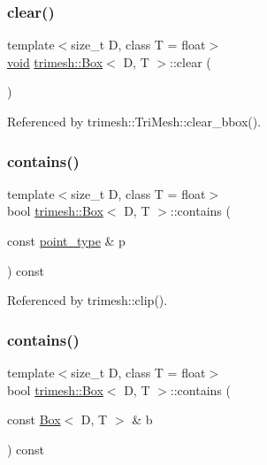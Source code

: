 \subsubsection{\texorpdfstring{clear()}{clear()}}
{\footnotesize\ttfamily template$<$size\+\_\+t D, class T = float$>$ \\
\hyperlink{namespacetrimesh_a784ddfd979e1c579bda795a8edfc3f43}{void} \hyperlink{classtrimesh_1_1Box}{trimesh\+::\+Box}$<$ D, T $>$\+::clear (\begin{DoxyParamCaption}{ }\end{DoxyParamCaption})\hspace{0.3cm}{\ttfamily [inline]}}



Referenced by trimesh\+::\+Tri\+Mesh\+::clear\+\_\+bbox().

\mbox{\label{classtrimesh_1_1Box_abed49b215db7d2affea33694a82327d4}} 
\subsubsection{\texorpdfstring{contains()}{contains()}\hspace{0.1cm}{\footnotesize\ttfamily [1/2]}}
{\footnotesize\ttfamily template$<$size\+\_\+t D, class T = float$>$ \\
bool \hyperlink{classtrimesh_1_1Box}{trimesh\+::\+Box}$<$ D, T $>$\+::contains (\begin{DoxyParamCaption}\item[{const \hyperlink{classtrimesh_1_1Box_a208c806781f96a7001491a275dfa7655}{point\+\_\+type} \&}]{p }\end{DoxyParamCaption}) const\hspace{0.3cm}{\ttfamily [inline]}}



Referenced by trimesh\+::clip().

\mbox{\label{classtrimesh_1_1Box_a8846c5b376e879c540e65e128e372cf2}} 
\subsubsection{\texorpdfstring{contains()}{contains()}\hspace{0.1cm}{\footnotesize\ttfamily [2/2]}}
{\footnotesize\ttfamily template$<$size\+\_\+t D, class T = float$>$ \\
bool \hyperlink{classtrimesh_1_1Box}{trimesh\+::\+Box}$<$ D, T $>$\+::contains (\begin{DoxyParamCaption}\item[{const \hyperlink{classtrimesh_1_1Box}{Box}$<$ D, T $>$ \&}]{b }\end{DoxyParamCaption}) const\hspace{0.3cm}{\ttfamily [inline]}}

